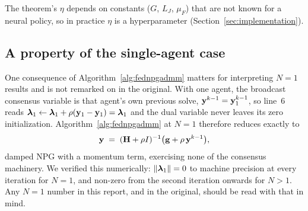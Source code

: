 The theorem's $\eta$ depends on constants ($G$, $L_J$, $\mu_F$) that are not
known for a neural policy, so in practice $\eta$ is a hyperparameter
(Section~\ref{sec:implementation}).

\subsection{A property of the single-agent case}

One consequence of Algorithm~\ref{alg:fednpgadmm} matters for interpreting
$N=1$ results and is not remarked on in the original. With one agent, the
broadcast consensus variable is that agent's own previous solve, $\mathbf{y}^{k-1} =
\mathbf{y}_1^{k-1}$, so line~6 reads $\boldsymbol{\lambda}_1 \leftarrow \boldsymbol{\lambda}_1 + \rho(\mathbf{y}_1 -
\mathbf{y}_1) = \boldsymbol{\lambda}_1$ and the dual variable never leaves its zero initialization.
Algorithm~\ref{alg:fednpgadmm} at $N = 1$ therefore reduces exactly to
\begin{equation}
  \mathbf{y} \;=\; (\mathbf{H} + \rho I)^{-1}\big(\mathbf{g} + \rho\,\mathbf{y}^{k-1}\big),
\end{equation}
damped NPG with a momentum term, exercising none of the consensus machinery.
We verified this numerically: $\|\boldsymbol{\lambda}_1\| = 0$ to machine precision at every
iteration for $N=1$, and non-zero from the second iteration onwards for $N >
1$. Any $N = 1$ number in this report, and in the original, should be read
with that in mind.
